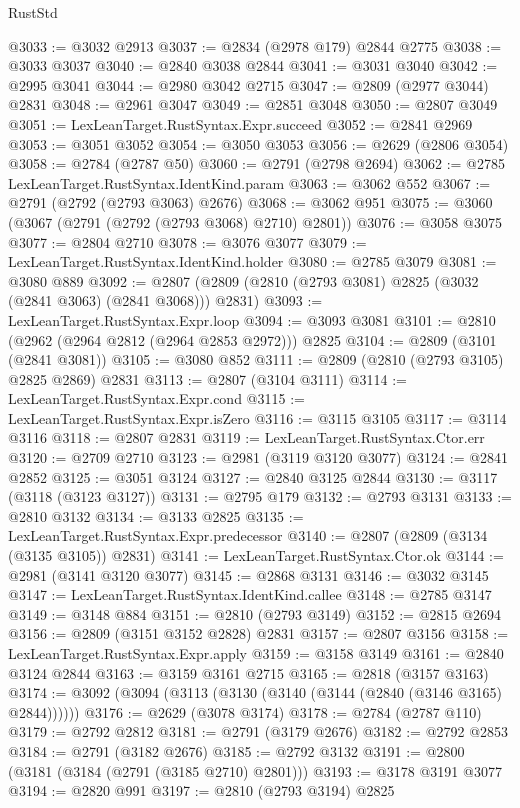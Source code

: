 \begin{lexlean}{RustStd}
\begin{coremodule}
@3033 := @3032 @2913
@3037 := @2834 (@2978 @179) @2844 @2775
@3038 := @3033 @3037
@3040 := @2840 @3038 @2844
@3041 := @3031 @3040
@3042 := @2995 @3041
@3044 := @2980 @3042 @2715
@3047 := @2809 (@2977 @3044) @2831
@3048 := @2961 @3047
@3049 := @2851 @3048
@3050 := @2807 @3049
@3051 := LexLeanTarget.RustSyntax.Expr.succeed
@3052 := @2841 @2969
@3053 := @3051 @3052
@3054 := @3050 @3053
@3056 := @2629 (@2806 @3054)
@3058 := @2784 (@2787 @50)
@3060 := @2791 (@2798 @2694)
@3062 := @2785 LexLeanTarget.RustSyntax.IdentKind.param
@3063 := @3062 @552
@3067 := @2791 (@2792 (@2793 @3063) @2676)
@3068 := @3062 @951
@3075 := @3060 (@3067 (@2791 (@2792 (@2793 @3068) @2710) @2801))
@3076 := @3058 @3075
@3077 := @2804 @2710
@3078 := @3076 @3077
@3079 := LexLeanTarget.RustSyntax.IdentKind.holder
@3080 := @2785 @3079
@3081 := @3080 @889
@3092 := @2807 (@2809 (@2810 (@2793 @3081) @2825 (@3032 (@2841 @3063) (@2841 @3068))) @2831)
@3093 := LexLeanTarget.RustSyntax.Expr.loop
@3094 := @3093 @3081
@3101 := @2810 (@2962 (@2964 @2812 (@2964 @2853 @2972))) @2825
@3104 := @2809 (@3101 (@2841 @3081))
@3105 := @3080 @852
@3111 := @2809 (@2810 (@2793 @3105) @2825 @2869) @2831
@3113 := @2807 (@3104 @3111)
@3114 := LexLeanTarget.RustSyntax.Expr.cond
@3115 := LexLeanTarget.RustSyntax.Expr.isZero
@3116 := @3115 @3105
@3117 := @3114 @3116
@3118 := @2807 @2831
@3119 := LexLeanTarget.RustSyntax.Ctor.err
@3120 := @2709 @2710
@3123 := @2981 (@3119 @3120 @3077)
@3124 := @2841 @2852
@3125 := @3051 @3124
@3127 := @2840 @3125 @2844
@3130 := @3117 (@3118 (@3123 @3127))
@3131 := @2795 @179
@3132 := @2793 @3131
@3133 := @2810 @3132
@3134 := @3133 @2825
@3135 := LexLeanTarget.RustSyntax.Expr.predecessor
@3140 := @2807 (@2809 (@3134 (@3135 @3105)) @2831)
@3141 := LexLeanTarget.RustSyntax.Ctor.ok
@3144 := @2981 (@3141 @3120 @3077)
@3145 := @2868 @3131
@3146 := @3032 @3145
@3147 := LexLeanTarget.RustSyntax.IdentKind.callee
@3148 := @2785 @3147
@3149 := @3148 @884
@3151 := @2810 (@2793 @3149)
@3152 := @2815 @2694
@3156 := @2809 (@3151 @3152 @2828) @2831
@3157 := @2807 @3156
@3158 := LexLeanTarget.RustSyntax.Expr.apply
@3159 := @3158 @3149
@3161 := @2840 @3124 @2844
@3163 := @3159 @3161 @2715
@3165 := @2818 (@3157 @3163)
@3174 := @3092 (@3094 (@3113 (@3130 (@3140 (@3144 (@2840 (@3146 @3165) @2844))))))
@3176 := @2629 (@3078 @3174)
@3178 := @2784 (@2787 @110)
@3179 := @2792 @2812
@3181 := @2791 (@3179 @2676)
@3182 := @2792 @2853
@3184 := @2791 (@3182 @2676)
@3185 := @2792 @3132
@3191 := @2800 (@3181 (@3184 (@2791 (@3185 @2710) @2801)))
@3193 := @3178 @3191 @3077
@3194 := @2820 @991
@3197 := @2810 (@2793 @3194) @2825

\end{coremodule}
\end{lexlean}
